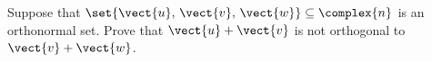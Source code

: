 Suppose that $\set{\vect{u},\,\vect{v},\,\vect{w}}\subseteq\complex{n}$ is an orthonormal set.  Prove that $\vect{u}+\vect{v}$ is not orthogonal to $\vect{v}+\vect{w}$.